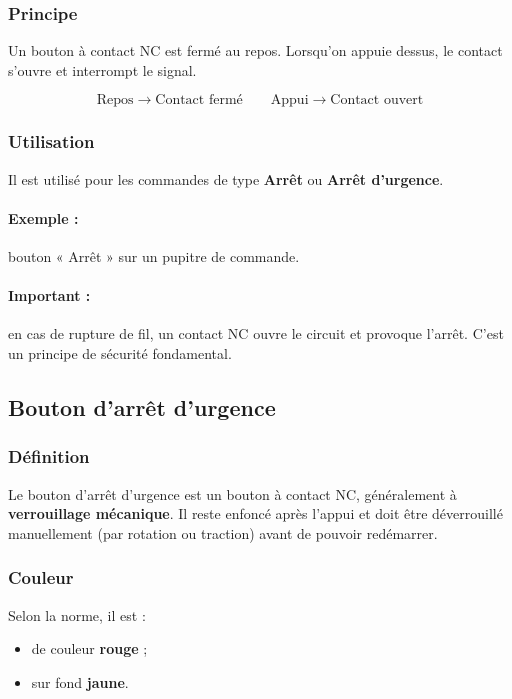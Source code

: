 \subsubsection{Principe}

Un bouton à contact NC est fermé au repos. Lorsqu'on appuie dessus, le contact s'ouvre et interrompt le signal.

\[
\text{Repos} \rightarrow \text{Contact fermé}
\qquad
\text{Appui} \rightarrow \text{Contact ouvert}
\]

\subsubsection{Utilisation}

Il est utilisé pour les commandes de type \textbf{Arrêt} ou \textbf{Arrêt d'urgence}.

\paragraph{Exemple :} bouton « Arrêt » sur un pupitre de commande.

\paragraph{Important :} en cas de rupture de fil, un contact NC ouvre le circuit et provoque l'arrêt. C'est un principe de sécurité fondamental.

\subsection{Bouton d'arrêt d'urgence}

\subsubsection{Définition}

Le bouton d'arrêt d'urgence est un bouton à contact NC, généralement à \textbf{verrouillage mécanique}. Il reste enfoncé après l'appui et doit être déverrouillé manuellement (par rotation ou traction) avant de pouvoir redémarrer.

\subsubsection{Couleur}

Selon la norme, il est :

\begin{itemize}
    \item de couleur \textbf{rouge} ;
    \item sur fond \textbf{jaune}.
\end{itemize}

